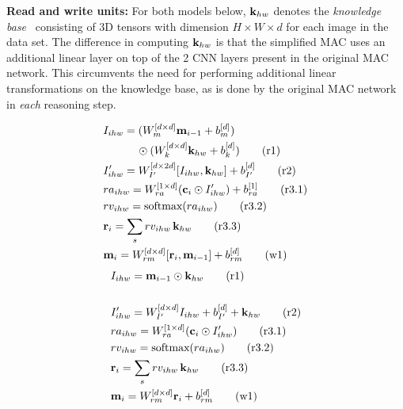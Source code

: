 \noindent\textbf{Read and write units:}
For both models below, $\mathbf{k}_{hw}$ denotes the \emph{knowledge base}~\cite{hudsonManning18}
consisting of 3D tensors with dimension $H \times W \times d$ for each image
in the data set. The difference in computing $\mathbf{k}_{hw}$ is that the simplified MAC uses
an additional linear layer on top of the 2 CNN layers present in the original MAC network.
This circumvents the need for performing additional linear transformations on the 
knowledge base, as is done by the original MAC network in \emph{each} reasoning step.

\begin{multicols}{2}
	\noindent
	\begin{align*}
	&I_{ihw} = (W_{m}^{[d \times d]} \mathbf{m}_{i-1} + b_{m}^{[d]}) \\
	           & \qquad \quad \odot (W_{k}^{[d \times d]} \mathbf{k}_{hw} + b_{k}^{[d]}) \tag{r1} \\
	&I'_{ihw} =  W_{I'}^{[d \times 2d]} [I_{ihw},\mathbf{k}_{hw}]  + b_{I'}^{[d]}  \tag{r2} \\
	&ra_{ihw} = W_{ra}^{[1 \times d]} (\mathbf{c}_i \odot I'_{ihw}) + b_{ra}^{[1]} \tag{r3.1}\\
	&rv_{ihw} = \textrm{softmax}(ra_{ihw}) \tag{r3.2}\\
	&\mathbf{r}_i = \sum_s rv_{ihw} \, \mathbf{k}_{hw}  \tag{r3.3}\\
	&\mathbf{m}_i = W_{rm}^{[d \times d]} [\mathbf{r}_i, \mathbf{m}_{i-1}]  + b_{rm}^{[d]} \tag{w1}	
	\end{align*}
	\columnbreak
	{\color{Plum}
	\begin{align*}
	&I_{ihw} = \mathbf{m}_{i-1} \odot \mathbf{k}_{hw} \tag{r1} \\ \\
	&I'_{ihw} = W_{I'}^{[d \times d]} I_{ihw} + b_{I'}^{[d]} + \mathbf{k}_{hw} \tag{r2} \\
	&ra_{ihw} = W_{ra}^{[1 \times d]} (\mathbf{c}_i \odot I'_{ihw})  \tag{r3.1}\\
	&rv_{ihw} = \textrm{softmax}(ra_{ihw}) \tag{r3.2}\\
	&\mathbf{r}_i = \sum_s rv_{ihw} \, \mathbf{k}_{hw}  \tag{r3.3}\\
	&\mathbf{m}_i = W_{rm}^{[d \times d]} \mathbf{r}_i + b_{rm}^{[d]} \tag{w1}
	\end{align*}}
\end{multicols}

